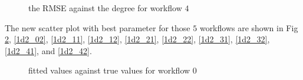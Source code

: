 \documentclass{article}
\begin{document}
\begin{figure}[!htbp]
\centering
{}
\caption{the RMSE against the degree for workflow $4$} \label{1d2_40}
\end{figure}



The new scatter plot with best parameter for those $5$ workflows are shown in Fig \ref{1d2_01}, \ref{1d2_02}, \ref{1d2_11}, \ref{1d2_12}, \ref{1d2_21}, \ref{1d2_22}, \ref{1d2_31}, \ref{1d2_32}, \ref{1d2_41}, and \ref{1d2_42}.

\begin{figure}[!htbp]
\centering
{}
\caption{fitted values against true values for workflow $0$} \label{1d2_01}
\end{figure}
\end{document}
